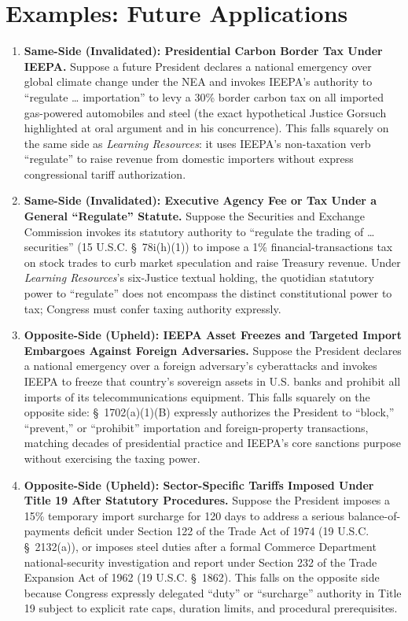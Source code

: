 \documentclass[12pt]{article}
\begin{document}
\section{Examples: Future Applications}
\begin{enumerate}
\item \textbf{Same-Side (Invalidated): Presidential Carbon Border Tax Under IEEPA.} Suppose a future President declares a national emergency over global climate change under the NEA and invokes IEEPA's authority to ``regulate \ldots{} importation'' to levy a 30\% border carbon tax on all imported gas-powered automobiles and steel (the exact hypothetical Justice Gorsuch highlighted at oral argument and in his concurrence). This falls squarely on the same side as \textit{Learning Resources}: it uses IEEPA's non-taxation verb ``regulate'' to raise revenue from domestic importers without express congressional tariff authorization.
\item \textbf{Same-Side (Invalidated): Executive Agency Fee or Tax Under a General ``Regulate'' Statute.} Suppose the Securities and Exchange Commission invokes its statutory authority to ``regulate the trading of \ldots{} securities'' (15 U.S.C. \S~78i(h)(1)) to impose a 1\% financial-transactions tax on stock trades to curb market speculation and raise Treasury revenue. Under \textit{Learning Resources}'s six-Justice textual holding, the quotidian statutory power to ``regulate'' does not encompass the distinct constitutional power to tax; Congress must confer taxing authority expressly.
\item \textbf{Opposite-Side (Upheld): IEEPA Asset Freezes and Targeted Import Embargoes Against Foreign Adversaries.} Suppose the President declares a national emergency over a foreign adversary's cyberattacks and invokes IEEPA to freeze that country's sovereign assets in U.S. banks and prohibit all imports of its telecommunications equipment. This falls squarely on the opposite side: \S~1702(a)(1)(B) expressly authorizes the President to ``block,'' ``prevent,'' or ``prohibit'' importation and foreign-property transactions, matching decades of presidential practice and IEEPA's core sanctions purpose without exercising the taxing power.
\item \textbf{Opposite-Side (Upheld): Sector-Specific Tariffs Imposed Under Title 19 After Statutory Procedures.} Suppose the President imposes a 15\% temporary import surcharge for 120 days to address a serious balance-of-payments deficit under Section 122 of the Trade Act of 1974 (19 U.S.C. \S~2132(a)), or imposes steel duties after a formal Commerce Department national-security investigation and report under Section 232 of the Trade Expansion Act of 1962 (19 U.S.C. \S~1862). This falls on the opposite side because Congress expressly delegated ``duty'' or ``surcharge'' authority in Title 19 subject to explicit rate caps, duration limits, and procedural prerequisites.

\end{enumerate}
\end{document}
